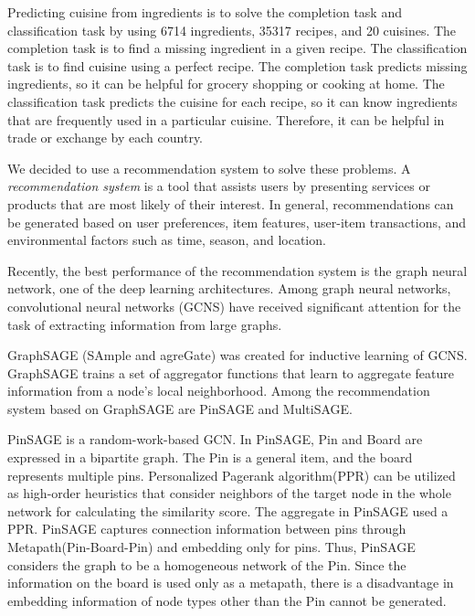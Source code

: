 Predicting cuisine from ingredients is to solve the completion task and classification task by using 6714 ingredients, 35317 recipes, and 20 cuisines.
The completion task is to find a missing ingredient in a given recipe.
The classification task is to find cuisine using a perfect recipe.
The completion task predicts missing ingredients, so it can be helpful for grocery shopping or cooking at home.
The classification task predicts the cuisine for each recipe, so it can know ingredients that are frequently used in a particular cuisine.
Therefore, it can be helpful in trade or exchange by each country.

We decided to use a recommendation system to solve these problems.
A \emph{recommendation system} is a tool that assists users by presenting services or products that are most likely of their interest.
In general, recommendations can be generated based on user preferences, item features, user-item transactions, and environmental factors such as time, season, and location\cite{da2020recommendation}.

Recently, the best performance of the recommendation system is the graph neural network, one of the deep learning architectures.
Among graph neural networks, convolutional neural networks (GCNS) have received significant attention for the task of extracting information from large graphs\cite{chen2018fastgcn}.

GraphSAGE (SAmple and agreGate)\cite{hamilton2017inductive} was created for inductive learning of GCNS.
GraphSAGE trains a set of aggregator functions that learn to aggregate feature information from a node's local neighborhood.
Among the recommendation system based on GraphSAGE are PinSAGE and  MultiSAGE.

PinSAGE\cite{ying2018graph} is a random-work-based GCN. In PinSAGE, Pin and Board are expressed in a bipartite graph.
The Pin is a general item, and the board represents multiple pins.
Personalized Pagerank algorithm(PPR)\cite{bahmani2010fast} can be utilized as high-order heuristics that consider neighbors of the target node in the whole network for calculating the similarity score.
The aggregate in PinSAGE used a PPR.
PinSAGE captures connection information between pins through Metapath(Pin-Board-Pin) and embedding only for pins.
Thus, PinSAGE considers the graph to be a homogeneous network of the Pin.
Since the information on the board is used only as a metapath, there is a disadvantage in embedding information of node types other than the Pin cannot be generated.

